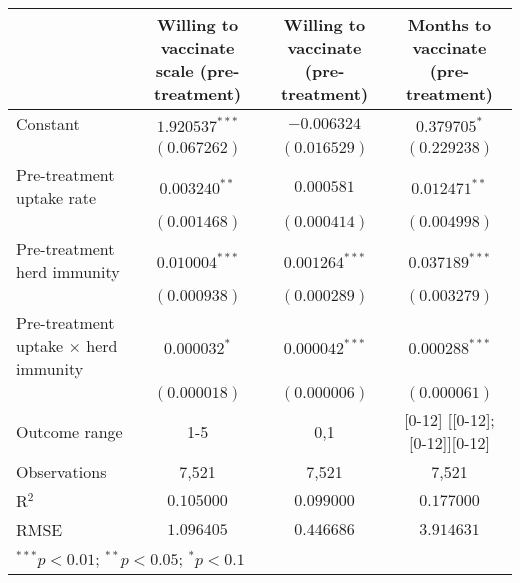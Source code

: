 \begin{table}
\begin{center}
\begin{tabular}{l c c c}
\hline
 & Willing to vaccinate scale (pre-treatment) & Willing to vaccinate (pre-treatment) & Months to vaccinate (pre-treatment) \\
\hline
Constant                                    & $1.920537^{***}$ & $-0.006324$      & $0.379705^{*}$                \\
                                            & $(0.067262)$     & $(0.016529)$     & $(0.229238)$                  \\
Pre-treatment uptake rate                   & $0.003240^{**}$  & $0.000581$       & $0.012471^{**}$               \\
                                            & $(0.001468)$     & $(0.000414)$     & $(0.004998)$                  \\
Pre-treatment herd immunity                 & $0.010004^{***}$ & $0.001264^{***}$ & $0.037189^{***}$              \\
                                            & $(0.000938)$     & $(0.000289)$     & $(0.003279)$                  \\
Pre-treatment uptake $\times$ herd immunity & $0.000032^{*}$   & $0.000042^{***}$ & $0.000288^{***}$              \\
                                            & $(0.000018)$     & $(0.000006)$     & $(0.000061)$                  \\
\hline
Outcome range                               & {1-5}            & {0,1}            & [0-12] [[0-12]; [0-12]][0-12] \\
Observations                                & 7,521            & 7,521            & 7,521                         \\
R$^{2}$                                     & $0.105000$       & $0.099000$       & $0.177000$                    \\
RMSE                                        & $1.096405$       & $0.446686$       & $3.914631$                    \\
\hline
\multicolumn{4}{l}{\scriptsize{$^{***}p<0.01$; $^{**}p<0.05$; $^{*}p<0.1$}}
\end{tabular}
\caption{}
\label{table:SI_table20_pretreat_outcomes_on_rates}
\end{center}
\end{table}
